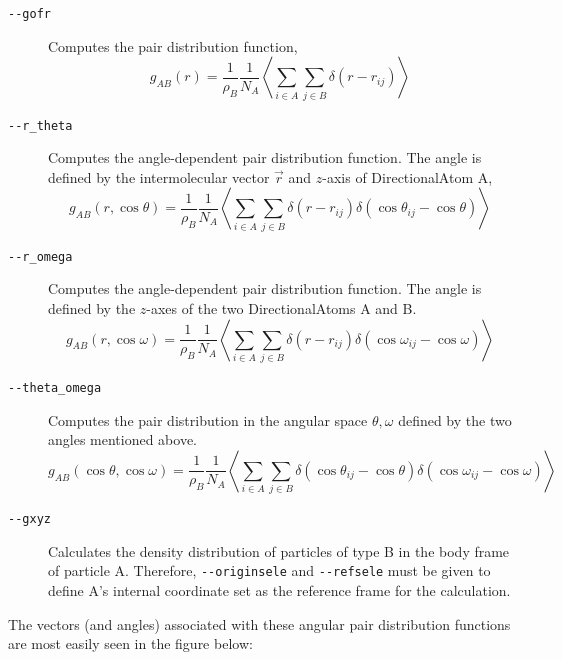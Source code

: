 \documentclass[letterpaper]{report}
\begin{document}
\begin{description}
\item[{\tt -{}-gofr}] Computes the pair distribution function,
\begin{equation*}
g_{AB}(r) = \frac{1}{\rho_B}\frac{1}{N_A} \left\langle \sum_{i \in A}
\sum_{j \in B} \delta(r - r_{ij}) \right\rangle
\end{equation*}
\item[{\tt -{}-r\_theta}] Computes the angle-dependent pair distribution
function. The angle is defined by the intermolecular vector $\vec{r}$ and
$z$-axis of DirectionalAtom A,
\begin{equation*}
g_{AB}(r, \cos \theta) = \frac{1}{\rho_B}\frac{1}{N_A} \left\langle \sum_{i \in A}
\sum_{j \in B} \delta(r - r_{ij}) \delta(\cos \theta_{ij} - \cos \theta)\right\rangle
\end{equation*}
\item[{\tt -{}-r\_omega}] Computes the angle-dependent pair distribution
function. The angle is defined by the $z$-axes of the two
DirectionalAtoms A and B. 
\begin{equation*}
g_{AB}(r, \cos \omega) = \frac{1}{\rho_B}\frac{1}{N_A} \left\langle \sum_{i \in A}
\sum_{j \in B} \delta(r - r_{ij}) \delta(\cos \omega_{ij} - \cos \omega)\right\rangle
\end{equation*}
\item[{\tt -{}-theta\_omega}] Computes the pair distribution in the angular
space $\theta, \omega$ defined by the two angles mentioned above.
\begin{equation*}
g_{AB}(\cos\theta, \cos \omega) = \frac{1}{\rho_B}\frac{1}{N_A} \left\langle \sum_{i \in A}
\sum_{j \in B} \delta(\cos \theta_{ij} - \cos \theta)
\delta(\cos \omega_{ij} - \cos \omega)\right\rangle
\end{equation*}
\item[{\tt -{}-gxyz}] Calculates the density distribution of particles of type
B in the body frame of particle A. Therefore, {\tt -{}-originsele} and
{\tt -{}-refsele} must be given to define A's internal coordinate set as
the reference frame for the calculation.
\end{description}

The vectors (and angles) associated with these angular pair
distribution functions are most easily seen in the figure below:
\end{document}
